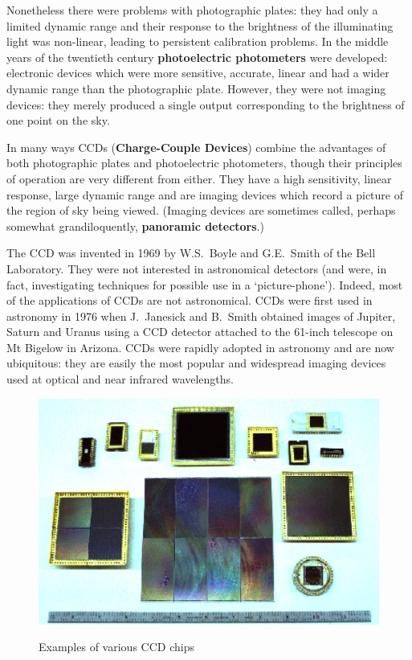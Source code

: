 \documentclass[twoside,11pt]{article}
\begin{document}
Nonetheless there were problems with photographic plates: they had only
a limited dynamic range and their response to the brightness of the
illuminating light was non-linear, leading to persistent calibration
problems.  In the middle years of the twentieth century {\bf photoelectric
photometers} were developed: electronic devices which were more sensitive,
accurate, linear and had a wider dynamic range than the photographic
plate.  However, they were not imaging devices: they merely produced a
single output corresponding to the brightness of one point on the sky.

In many ways CCDs ({\bf Charge-Couple Devices}) combine the advantages
of both photographic plates and photoelectric photometers, though their
principles of operation are very different from either.  They have a high
sensitivity, linear response, large dynamic range and are imaging devices
which record a picture of the region of sky being viewed.  (Imaging devices
are sometimes called, perhaps somewhat grandiloquently, {\bf panoramic
detectors}.)

The CCD was invented in 1969 by W.S.~Boyle and G.E.~Smith of the Bell
Laboratory.  They were not interested in astronomical detectors (and were,
in fact, investigating techniques for possible use in a `picture-phone').
Indeed, most of the applications of CCDs are not astronomical.  CCDs
were first used in astronomy in 1976 when J.~Janesick and B.~Smith
obtained images of Jupiter, Saturn and Uranus using a CCD detector
attached to the 61-inch telescope on Mt Bigelow in Arizona.  CCDs were
rapidly adopted in astronomy and are now ubiquitous: they are easily
the most popular and widespread imaging devices used at optical and
near infrared wavelengths.

\begin{figure}[htbp]
   \centering 
   \includegraphics[totalheight=4in]{sc5_ccdlup.ps}
   \begin{quote}
   \caption{Examples of various CCD chips
   \label{CCDLUP} }
   \end{quote}
\end{figure}
\end{document}
